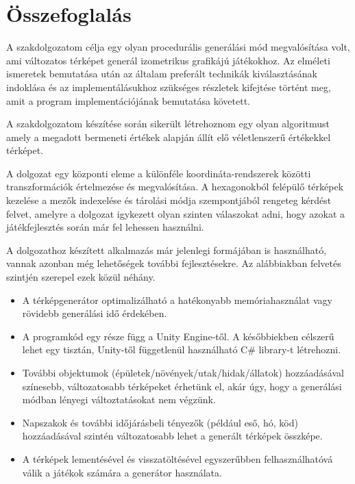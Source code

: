 \chapter*{Összefoglalás}

A szakdolgozatom célja egy olyan procedurális generálási mód megvalósítása volt, ami változatos térképet generál izometrikus grafikájú játékokhoz. Az elméleti ismeretek bemutatása után az általam preferált technikák kiválasztásának indoklása és az implementálásukhoz szükséges részletek kifejtése történt meg, amit a program implementációjának bemutatása követett.

A szakdolgozatom készítése során sikerült létrehoznom egy olyan algoritmust amely a megadott bermeneti értékek alapján állít elő véletlenszerű értékekkel térképet.

A dolgozat egy központi eleme a különféle koordináta-rendszerek közötti transzformációk értelmezése és megvalósítása. A hexagonokból felépülő térképek kezelése a mezők indexelése és tárolási módja szempontjából rengeteg kérdést felvet, amelyre a dolgozat igykezett olyan szinten válaszokat adni, hogy azokat a játékfejlesztés során már fel lehessen használni.

\bigskip

A dolgozathoz készített alkalmazás már jelenlegi formájában is használható, vannak azonban még lehetőségek további fejlesztésekre. Az alábbiakban felvetés szintjén szerepel ezek közül néhány.
\begin{itemize}
\item A térképgenerátor optimalizálható a hatékonyabb memóriahasználat vagy rövidebb generálási idő érdekében.
\item A programkód egy része függ a Unity Engine-től. A későbbiekben célszerű lehet egy tisztán, Unity-től függetlenül használható C\# library-t létrehozni.
\item További objektumok (épületek/növények/utak/hidak/állatok) hozzáadásával színesebb, változatosabb térképeket érhetünk el, akár úgy, hogy a generálási módban lényegi változtatásokat nem végzünk.
\item Napszakok és további időjárásbeli tényezők (például eső, hó, köd) hozzáadásával szintén változatosabb lehet a generált térképek összképe.
\item A térképek lementésével és visszatöltésével egyszerűbben felhasználhatóvá válik a játékok számára a generátor használata.
\end{itemize}

